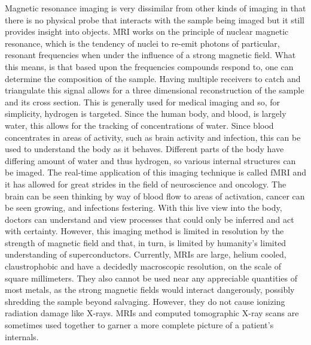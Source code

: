 Magnetic resonance imaging is very dissimilar from other kinds of imaging in that there is no physical probe that interacts with the sample being imaged but it still provides insight into objects. MRI works on the principle of nuclear magnetic resonance, which is the tendency of nuclei to re-emit photons of particular, resonant frequencies when under the influence of a strong magnetic field. What this means, is that based upon the frequencies compounds respond to, one can determine the composition of the sample. Having multiple receivers to catch and triangulate this signal allows for a three dimensional reconstruction of the sample and its cross section. This is generally used for medical imaging and so, for simplicity, hydrogen is targeted. Since the human body, and blood, is largely water, this allows for the tracking of concentrations of water. Since blood concentrates in areas of activity, such as brain activity and infection, this can be used to understand the body as it behaves. Different parts of the body have differing amount of water and thus hydrogen, so various internal structures can be imaged. The real-time application of this imaging technique is called fMRI and it has allowed for great strides in the field of neuroscience and oncology. The brain can be seen thinking by way of blood flow to areas of activation, cancer can be seen growing, and infections festering. With this live view into the body, doctors can understand and view processes that could only be inferred and act with certainty. However, this imaging method is limited in resolution by the strength of magnetic field and that, in turn, is limited by humanity's limited understanding of superconductors. Currently, MRIs are large, helium cooled, claustrophobic and have a decidedly macroscopic resolution, on the scale of square millimeters. They also cannot be used near any appreciable quantities of most metals, as the strong magnetic fields would interact dangerously, possibly shredding the sample beyond salvaging. However, they do not cause ionizing radiation damage like X-rays. MRIs and computed tomographic X-ray scans are sometimes used together to garner a more complete picture of a patient's internals.\\

